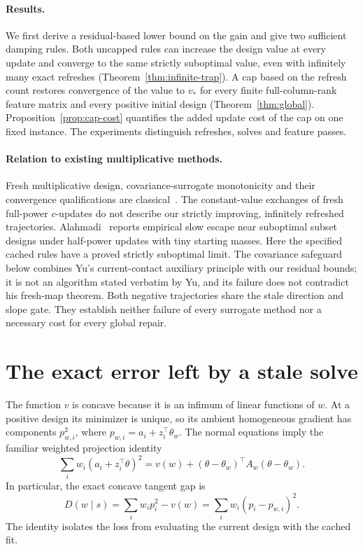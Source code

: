 \documentclass[11pt]{article}
\begin{document}
\paragraph{Results.}
We first derive a residual-based lower bound on the gain and give two sufficient damping rules. Both uncapped rules can increase the design value at every update and converge to the same strictly suboptimal value, even with infinitely many exact refreshes (Theorem~\ref{thm:infinite-trap}). A cap based on the refresh count restores convergence of the value to $v_*$ for every finite full-column-rank feature matrix and every positive initial design (Theorem~\ref{thm:global}). Proposition~\ref{prop:cap-cost} quantifies the added update cost of the cap on one fixed instance. The experiments distinguish refreshes, solves and feature passes.

\paragraph{Relation to existing multiplicative methods.}
Fresh multiplicative design, covariance-surrogate monotonicity and their convergence qualifications are classical~\cite{yu2010,zhao2025}. The constant-value exchanges of fresh full-power $c$-updates do not describe our strictly improving, infinitely refreshed trajectories. Alahmadi~\cite[Sec.~2.5.2, pp.~34--37]{alahmadi1993} reports empirical slow escape near suboptimal subset designs under half-power updates with tiny starting masses. Here the specified cached rules have a proved strictly suboptimal limit. The covariance safeguard below combines Yu's current-contact auxiliary principle with our residual bounds; it is not an algorithm stated verbatim by Yu, and its failure does not contradict his fresh-map theorem. Both negative trajectories share the stale direction and slope gate. They establish neither failure of every surrogate method nor a necessary cost for every global repair.

\section{The exact error left by a stale solve}
The function $v$ is concave because it is an infimum of linear functions of $w$.
At a positive design its minimizer is unique, so its ambient homogeneous gradient has components $p_{w,i}^2$, where $p_{w,i}=a_i+z_i^\top\theta_w$.
The normal equations imply the familiar weighted projection identity
\begin{equation}\label{eq:pythag}
 \sum_iw_i(a_i+z_i^\top\theta)^2
 =v(w)+(\theta-\theta_w)^\top A_w(\theta-\theta_w).
\end{equation}
In particular, the exact concave tangent gap is
\begin{equation}\label{eq:bregman}
 D(w\mid s)=\sum_iw_ip_i^2-v(w)
 =\sum_iw_i(p_i-p_{w,i})^2.
\end{equation}
The identity isolates the loss from evaluating the current design with the cached fit.
\end{document}
